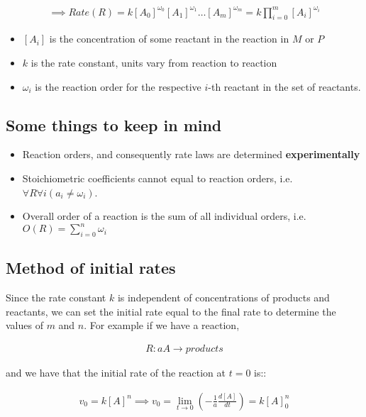 \documentclass[12pt]{book}
\begin{document}
\begin{align*}
    \implies Rate(R)=k[A_0]^{\omega_0}[A_1]^{\omega_1}\ldots[A_m]^{\omega_m}=k\prod_{i=0}^{m} [A_i]^{\omega_i}
\end{align*}

\begin{itemize}
    \item $[A_i]$ is the concentration of some reactant in the reaction in $M$ or $P$
    \item $k$ is the rate constant, units vary from reaction to reaction
    \item $\omega_i$ is the reaction order for the respective $i$-th reactant in the set of reactants.
\end{itemize}

\subsection*{Some things to keep in mind}

\begin{itemize}
    \item Reaction orders, and consequently rate laws are determined \textbf{experimentally}
    \item Stoichiometric coefficients cannot equal to reaction orders, i.e. $\forall R\forall i(a_i\neq \omega_i)$.
    \item Overall order of a reaction is the sum of all individual orders, i.e. \\$O(R)=\sum_{i=0}^{n} \omega_i$
\end{itemize}

\subsection*{Method of initial rates}

Since the rate constant $k$ is independent of concentrations of products and reactants, we can set the initial rate equal to the final rate to determine the values of $m$ and $n$. For example if we have a reaction,

\begin{align*}
    R: aA\rightarrow products
\end{align*}

and we have that the initial rate of the reaction at $t=0$ is::

\begin{align*}
    v_0=k[A]^n\implies v_0=\lim_{t\rightarrow 0}\left(-\frac{1}{a}\frac{d[A]}{dt}\right)=k[A]_0^n
\end{align*}
\end{document}
